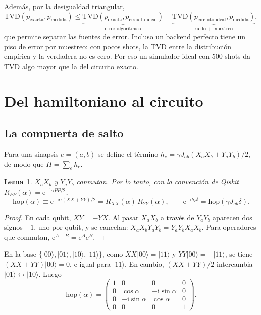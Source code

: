 \documentclass[11pt,a4paper]{article}
\renewcommand{\ket}[1]{\lvert #1\rangle}
\newcommand{\e}{\mathrm{e}}
\newcommand{\ii}{\mathrm{i}}
\newcommand{\hop}{\mathrm{hop}}
\newcommand{\TVD}{\mathrm{TVD}}
\newcommand{\RXX}{R_{XX}}
\newcommand{\RYY}{R_{YY}}
\theoremstyle{plain}
\newtheorem{lema}[proposicion]{Lema}
\theoremstyle{definition}
\theoremstyle{remark}
\begin{document}
Además, por la desigualdad triangular,
\begin{equation}
\TVD(p_{\text{exacta}},p_{\text{medida}}) \le
\underbrace{\TVD(p_{\text{exacta}},p_{\text{circuito ideal}})}_{\text{error algorítmico}}
+ \underbrace{\TVD(p_{\text{circuito ideal}},p_{\text{medida}})}_{\text{ruido + muestreo}},
\label{eq:triangular}
\end{equation}
que permite separar las fuentes de error. Incluso un backend perfecto tiene un piso de error por muestreo: con pocos shots, la TVD entre la distribución empírica y la verdadera no es cero. Por eso un simulador ideal con 500 shots da TVD algo mayor que la del circuito exacto.

\section{Del hamiltoniano al circuito}
\label{sec:circuito}

\subsection{La compuerta de salto}

Para una sinapsis $e=(a,b)$ se define el término $h_e = \gamma J_{ab}(X_aX_b+Y_aY_b)/2$, de modo que $H=\sum_e h_e$.

\begin{lema}\label{lema:hop}
$X_aX_b$ y $Y_aY_b$ conmutan. Por lo tanto, con la convención de Qiskit $R_{PP}(\alpha)=\e^{-\ii\alpha PP/2}$,
\begin{equation}
\hop(\alpha)\equiv\e^{-\ii\alpha(XX+YY)/2} = \RXX(\alpha)\,\RYY(\alpha),
\qquad
\e^{-\ii h_e\delta} = \hop(\gamma J_{ab}\delta).
\end{equation}
\end{lema}

\begin{proof}
En cada qubit, $XY=-YX$. Al pasar $X_aX_b$ a través de $Y_aY_b$ aparecen dos signos $-1$, uno por qubit, y se cancelan: $X_aX_bY_aY_b=Y_aY_bX_aX_b$. Para operadores que conmutan, $\e^{A+B}=\e^A\e^B$.
\end{proof}

En la base $\{\ket{00},\ket{01},\ket{10},\ket{11}\}$, como $XX\ket{00}=\ket{11}$ y $YY\ket{00}=-\ket{11}$, se tiene $(XX+YY)\ket{00}=0$, e igual para $\ket{11}$. En cambio, $(XX+YY)/2$ intercambia $\ket{01}\leftrightarrow\ket{10}$. Luego
\begin{equation}
\hop(\alpha)=
\begin{pmatrix}
1&0&0&0\\
0&\cos\alpha&-\ii\sin\alpha&0\\
0&-\ii\sin\alpha&\cos\alpha&0\\
0&0&0&1
\end{pmatrix}.
\label{eq:hopmatriz}
\end{equation}
\end{document}
